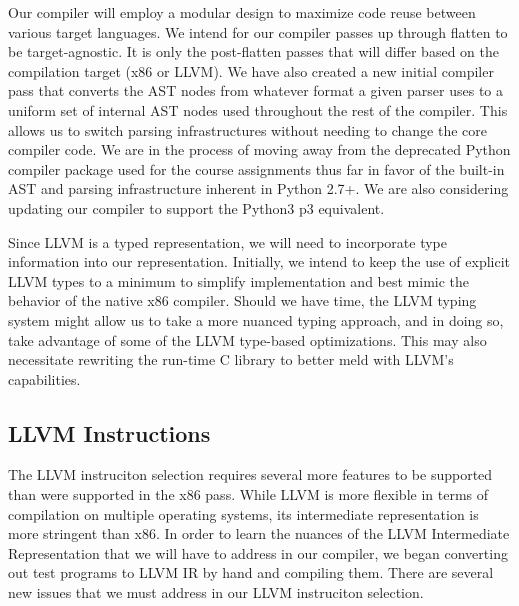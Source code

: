\documentclass[11pt]{article}
\begin{document}


Our compiler will employ a modular design to maximize code reuse
between various target languages.  We intend for our compiler passes
up through flatten to be target-agnostic. It is only the post-flatten
passes that will differ based on the compilation target (x86 or
LLVM). We have also created a new initial compiler pass that converts
the AST nodes from whatever format a given parser uses to a uniform
set of internal AST nodes used throughout the rest of the
compiler. This allows us to switch parsing infrastructures without
needing to change the core compiler code. We are in the process of
moving away from the deprecated Python compiler package used for the
course assignments thus far in favor of the built-in AST and parsing
infrastructure inherent in Python 2.7+. We are also considering
updating our compiler to support the Python3 p3 equivalent.

Since LLVM is a typed representation, we will need to incorporate type
information into our representation. Initially, we intend to keep the
use of explicit LLVM types to a minimum to simplify implementation and
best mimic the behavior of the native x86 compiler. Should we have
time, the LLVM typing system might allow us to take a more nuanced
typing approach, and in doing so, take advantage of some of the LLVM
type-based optimizations. This may also necessitate rewriting the
run-time C library to better meld with LLVM's capabilities.

\subsection{LLVM Instructions}

The LLVM instruciton selection requires several more features to be supported than were supported in the x86 pass. While LLVM is more flexible in terms of compilation on multiple operating systems, its intermediate representation is more stringent than x86. In order to learn the nuances of the LLVM Intermediate Representation that we will have to address in our compiler, we began converting out test programs to LLVM IR by hand and compiling them. There are several new issues that we must address in our LLVM instruciton selection.
\end{document}
